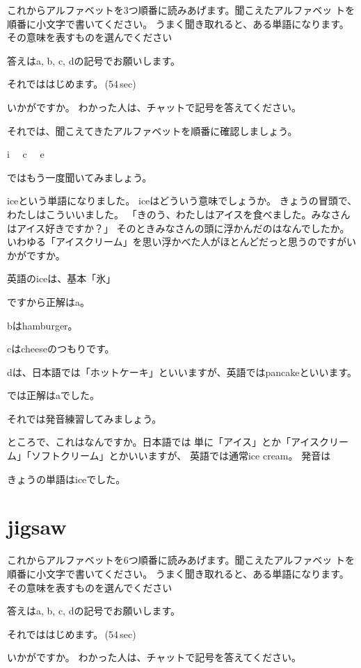 \documentclass[12pt]{jlreq}
\let\textipa\undefined
\begin{document}
これからアルファベットを3つ順番に読みあげます。聞こえたアルファベッ
トを順番に小文字で書いてください。
うまく聞き取れると、ある単語になります。
その意味を表すものを選んでください

答えはa, b, c, dの記号でお願いします。

それでははじめます。\faVolumeUp\,(54\,sec)

いかがですか。
わかった人は、チャットで記号を答えてください。

それでは、聞こえてきたアルファベットを順番に確認しましょう。{\large \ComputerMouse}

i\,\,
{\large \ComputerMouse}\,\,
c\,\,
{\large \ComputerMouse}\,\,
e\,\,

ではもう一度聞いてみましょう。


iceという単語になりました。
iceはどういう意味でしょうか。
きょうの冒頭で、
わたしはこういいました。
「きのう、わたしはアイスを食べました。みなさんはアイス好きですか？」
そのときみなさんの頭に浮かんだのはなんでしたか。
いわゆる「アイスクリーム」を思い浮かべた人がほとんどだっと思うのですがいかがですか。

英語のiceは、基本「氷」

ですから正解はa。

bはhamburger。

cはcheeseのつもりです。

dは、日本語では「ホットケーキ」といいますが、英語ではpancakeといいます。


では正解はaでした。\textipa{/aIs/}

それでは発音練習してみましょう。

ところで、これはなんですか。日本語では
単に「アイス」とか「アイスクリーム」「ソフトクリーム」とかいいますが、
英語では通常ice cream。
発音は\textipa{/aIs kri:m/}

きょうの単語はiceでした。
\newpage
\section{jigsaw}

これからアルファベットを6つ順番に読みあげます。聞こえたアルファベッ
トを順番に小文字で書いてください。
うまく聞き取れると、ある単語になります。
その意味を表すものを選んでください

答えはa, b, c, dの記号でお願いします。

それでははじめます。\faVolumeUp\,(54\,sec)

いかがですか。
わかった人は、チャットで記号を答えてください。
\end{document}
